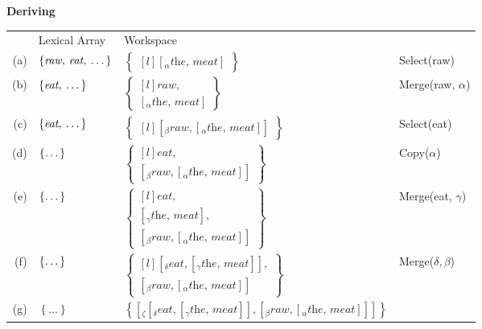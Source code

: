 \documentclass[letterpaper,12pt]{article}
\begin{document}
\begin{minipage}[t]{\textwidth}
  \textbf{Deriving \LLast}\\
  {\small
    \begin{tabular}[t]{rlp{}l}
  & Lexical Array & Workspace\\
  (a) & 
  $\left\{ \textit{raw, eat, \dots} \right\}$ &
  $
  \begin{Bmatrix*}[l]
   \left[_\alpha \textit{the, meat} \right] 
  \end{Bmatrix*}
  $
   &
   Select(raw)\\[1ex]
  (b) &
  $\left\{ \textit{eat, \dots} \right\}$ &
  $\begin{Bmatrix*}[l]
    \textit{raw},\\
    \left[_\alpha\textit{the, meat}\right]
  \end{Bmatrix*}$ 
  &
  Merge(raw, $\alpha$)\\
  (c) &
  $\left\{  \textit{eat, \dots}\right\}$ &
  $
  \begin{Bmatrix*}[l]
    \left[_\beta \textit{raw}, \left[_\alpha\textit{the, meat}\right] \right]
  \end{Bmatrix*}
    $ &
  Select(eat)\\
  (d) &
  $\left\{ \textit{\dots} \right\}$ &
  $
  \begin{Bmatrix*}[l]
    \textit{eat},\\ 
    \left[_\beta \textit{raw}, \left[_\alpha\textit{the, meat}\right] \right]
  \end{Bmatrix*}
  $ &
  Copy($\alpha$)\\
  (e) &
  $\left\{ \textit{\dots} \right\}$ &
  $
  \begin{Bmatrix*}[l]
    \textit{eat},\\
    \left[_\gamma\textit{the, meat}\right],\\
    \left[_\beta \textit{raw}, \left[_\alpha\textit{the, meat}\right] \right]
  \end{Bmatrix*}
  $
    &
  Merge(eat,  $\gamma$)\\
  (f) &
  $\left\{ \textit{\dots} \right\}$ &
  $
  \begin{Bmatrix*}[l]
    \left[_\delta\textit{eat}, \left[_\gamma\textit{the, meat}\right]\right],\\
    \left[_\beta \textit{raw}, \left[_\alpha\textit{the, meat}\right] \right]
  \end{Bmatrix*}
  $ 
  &
  Merge($\delta, \beta$)\\
  (g) &
  $\left\{ \ldots \right\}$ &
  $\left\{  \left[ _\zeta \left[_\delta\textit{eat}, \left[_\gamma\textit{the, meat}\right]\right], \left[_\beta \textit{raw}, \left[_\alpha\textit{the, meat}\right] \right] \right]\right\}$ &
  \\
\end{tabular}}
\end{minipage}
\end{document}
